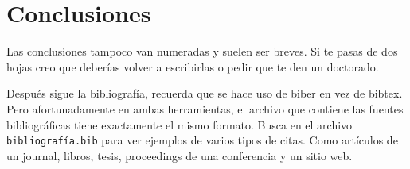 \chapter*{Conclusiones}

Las conclusiones tampoco van numeradas y suelen ser breves.
Si te pasas de dos hojas creo que deberías volver a escribirlas o pedir que te den un doctorado.

Después sigue la bibliografía, recuerda que se hace uso de biber en vez de bibtex.
Pero afortunadamente en ambas herramientas, el archivo que contiene las fuentes bibliográficas tiene exactamente el mismo formato.
Busca en el archivo \verb|bibliografía.bib| para ver ejemplos de varios tipos de citas.
Como artículos de un journal, libros, tesis, proceedings de una conferencia y un sitio web.

